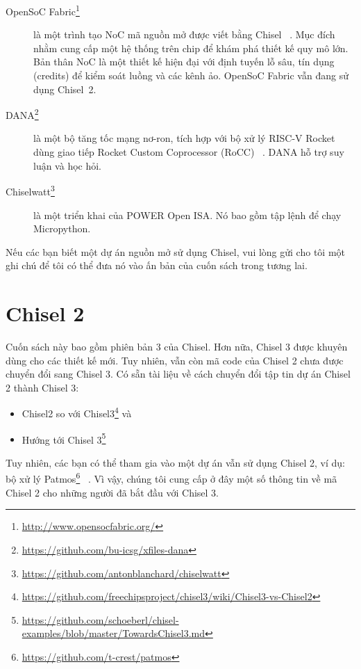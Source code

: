 \documentclass[%
    10pt,
    headinclude, footexclude,
    openright, %
    notitlepage,
    cleardoubleempty,
    headsepline,
    pointlessnumbers,
    bibtotoc, idxtotoc,
    ]{scrbook}
\newcommand{\myref}[2]{\href{#1}{#2}}
\renewcommand{\myref}[2]{{#2}{\footnote{\url{#1}}}}
\begin{document}
\begin{description}
\item[\myref{http://www.opensocfabric.org/}{OpenSoC Fabric}] là một trình tạo NoC mã nguồn mở được viết bằng Chisel ~\cite{OpenSoC:ispass2016}. Mục đích nhằm cung cấp một hệ thống trên chip để khám phá thiết kế quy mô lớn. Bản thân NoC là một thiết kế hiện đại với định tuyến lỗ sâu, tín dụng (credits) để kiểm soát luồng và các kênh ảo. OpenSoC Fabric vẫn đang sử dụng Chisel~2. 

\item[\myref{https://github.com/bu-icsg/xfiles-dana}{DANA}] là một bộ tăng tốc mạng nơ-ron, tích hợp với bộ xử lý RISC-V Rocket dùng giao tiếp Rocket Custom Coprocessor (RoCC) ~\cite{RoCC:2015}. DANA hỗ trợ suy luận và học hỏi. 

\item[\myref{https://github.com/antonblanchard/chiselwatt}{Chiselwatt}] là một triển khai của POWER Open ISA. Nó bao gồm tập lệnh để chạy Micropython.

\end{description}

Nếu các bạn biết một dự án nguồn mở sử dụng Chisel, vui lòng gửi cho tôi một ghi chú để tôi có thể đưa nó vào ấn bản của cuốn sách trong tương lai. 

\chapter{Chisel 2}


Cuốn sách này bao gồm phiên bản 3 của Chisel. Hơn nữa, Chisel 3 được khuyên dùng cho các thiết kế mới. Tuy nhiên, vẫn còn mã code của Chisel 2 chưa được chuyển đổi sang Chisel 3. Có sẵn tài liệu về cách chuyển đổi tập tin dự án Chisel 2 thành Chisel 3: 

\begin{itemize}
\item \myref{https://github.com/freechipsproject/chisel3/wiki/Chisel3-vs-Chisel2}{Chisel2 so với Chisel3} và
\item \myref{https://github.com/schoeberl/chisel-examples/blob/master/TowardsChisel3.md}{Hướng tới Chisel 3}
\end{itemize}

Tuy nhiên, các bạn có thể tham gia vào một dự án vẫn sử dụng Chisel 2, ví dụ: bộ xử lý \myref{https://github.com/t-crest/patmos}{Patmos} ~\cite{patmos:rts2018}. Vì vậy, chúng tôi cung cấp ở đây một số thông tin về mã Chisel 2 cho những người đã bắt đầu với Chisel 3. 
\end{document}
